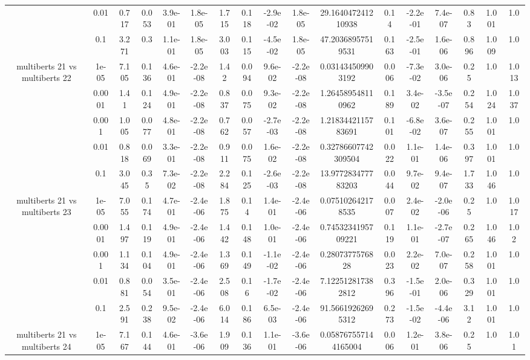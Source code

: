 \begin{tabular}{|c|c|c|c|c|c|c|c|c|c|c|c|c|c|c|c|c|}
 & 0.01 & 0.717 & 0.053 & 3.9e-01 & 1.8e-05 & 1.715 & 0.118 & -2.9e-02 & 1.8e-05 & 29.164047241210938 & 0.14 & -2.2e-01 & 7.4e-07 & 0.83 & 1.001 & 1.0 \\
 & 0.1 & 3.271 & 0.3 & 1.1e-01 & 1.8e-05 & 3.003 & 0.115 & -4.5e-02 & 1.8e-05 & 47.20368957519531 & 0.163 & -2.5e-01 & 1.6e-06 & 0.896 & 1.009 & 1.0 \\
\hline
\multirow{5}{*}{multiberts 21 vs multiberts 22} & 1e-05 & 7.105 & 0.136 & 4.6e-01 & -2.2e-08 & 1.42 & 0.094 & 9.6e-02 & -2.2e-08 & 0.031434509903192 & 0.006 & -7.3e-02 & 3.0e-06 & 0.25 & 1.0 & 1.013 \\
 & 0.0001 & 1.41 & 0.124 & 4.9e-01 & -2.2e-08 & 0.837 & 0.075 & 9.3e-02 & -2.2e-08 & 1.264589548110962 & 0.189 & 3.4e-02 & -3.5e-07 & 0.254 & 1.024 & 1.037 \\
 & 0.001 & 1.005 & 0.077 & 4.8e-01 & -2.2e-08 & 0.762 & 0.057 & -2.7e-03 & -2.2e-08 & 1.2183442115783691 & 0.101 & -6.8e-02 & 3.6e-07 & 0.255 & 1.001 & 1.0 \\
 & 0.01 & 0.818 & 0.069 & 3.3e-01 & -2.2e-08 & 0.911 & 0.075 & 1.6e-02 & -2.2e-08 & 0.32786607742309504 & 0.022 & 1.1e-01 & 1.4e-06 & 0.397 & 1.001 & 1.0 \\
 & 0.1 & 3.045 & 0.35 & 7.3e-02 & -2.2e-08 & 2.284 & 0.125 & -2.6e-03 & -2.2e-08 & 13.977283477783203 & 0.044 & 9.7e-02 & 9.4e-07 & 1.733 & 1.046 & 1.0 \\
\hline
\multirow{5}{*}{multiberts 21 vs multiberts 23} & 1e-05 & 7.055 & 0.174 & 4.7e-01 & -2.4e-06 & 1.875 & 0.14 & 1.4e-01 & -2.4e-06 & 0.075102642178535 & 0.007 & 2.4e-02 & -2.0e-06 & 0.25 & 1.0 & 1.017 \\
 & 0.0001 & 1.497 & 0.119 & 4.9e-01 & -2.4e-06 & 1.442 & 0.148 & 1.0e-01 & -2.4e-06 & 0.7453234195709221 & 0.119 & 1.1e-01 & -2.7e-07 & 0.265 & 1.046 & 1.02 \\
 & 0.001 & 1.134 & 0.104 & 4.9e-01 & -2.4e-06 & 1.369 & 0.149 & -1.1e-02 & -2.4e-06 & 0.2807377576828 & 0.023 & 2.2e-02 & 7.0e-07 & 0.258 & 1.001 & 1.0 \\
 & 0.01 & 0.881 & 0.054 & 3.5e-01 & -2.4e-06 & 2.508 & 0.16 & -1.7e-02 & -2.4e-06 & 7.122512817382812 & 0.396 & -1.5e-01 & 2.0e-06 & 0.329 & 1.001 & 1.0 \\
 & 0.1 & 2.591 & 0.238 & 9.5e-02 & -2.4e-06 & 6.014 & 0.186 & 6.5e-03 & -2.4e-06 & 91.56619262695312 & 0.273 & -1.5e-02 & -4.4e-06 & 3.12 & 1.001 & 1.0 \\
\hline
\multirow{5}{*}{multiberts 21 vs multiberts 24} & 1e-05 & 7.167 & 0.144 & 4.6e-01 & -3.6e-06 & 1.909 & 0.136 & 1.1e-01 & -3.6e-06 & 0.058767557144165004 & 0.006 & 1.2e-01 & 3.8e-06 & 0.25 & 1.0 & 1.01 \\

\end{tabular}
